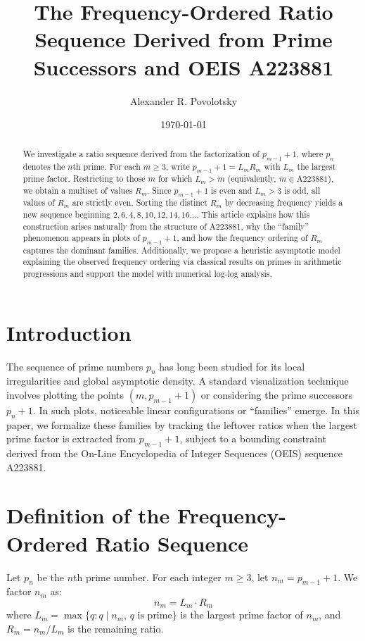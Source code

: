 \documentclass[11pt,fleqn]{article}
\begin{document}
\title{The Frequency-Ordered Ratio Sequence Derived from Prime Successors and OEIS A223881}
\author{Alexander R. Povolotsky}
\date{\today}
\maketitle

\begin{abstract}
We investigate a ratio sequence derived from the factorization of $p_{m-1} + 1$, where $p_n$ denotes the $n$th prime. For each $m \geq 3$, write $p_{m-1} + 1 = L_m R_m$ with $L_m$ the largest prime factor. Restricting to those $m$ for which $L_m > m$ (equivalently, $m \in \text{A223881}$), we obtain a multiset of values $R_m$. Since $p_{m-1}+1$ is even and $L_m > 3$ is odd, all values of $R_m$ are strictly even. Sorting the distinct $R_m$ by decreasing frequency yields a new sequence beginning $2, 6, 4, 8, 10, 12, 14, 16 \dots$. This article explains how this construction arises naturally from the structure of A223881, why the ``family'' phenomenon appears in plots of $p_{m-1} + 1$, and how the frequency ordering of $R_m$ captures the dominant families. Additionally, we propose a heuristic asymptotic model explaining the observed frequency ordering via classical results on primes in arithmetic progressions and support the model with numerical log-log analysis.
\end{abstract}

\section{Introduction}
The sequence of prime numbers $p_n$ has long been studied for its local irregularities and global asymptotic density. A standard visualization technique involves plotting the points $(m, p_{m-1}+1)$ or considering the prime successors $p_{n}+1$. In such plots, noticeable linear configurations or ``families'' emerge. In this paper, we formalize these families by tracking the leftover ratios when the largest prime factor is extracted from $p_{m-1}+1$, subject to a bounding constraint derived from the On-Line Encyclopedia of Integer Sequences (OEIS) sequence A223881.

\section{Definition of the Frequency-Ordered Ratio Sequence}
Let $p_n$ be the $n$th prime number. For each integer $m \geq 3$, let $n_m = p_{m-1} + 1$. We factor $n_m$ as:
\begin{equation}
    n_m = L_m \cdot R_m
\end{equation}
where $L_m = \max \{ q : q \mid n_m, \, q \text{ is prime} \}$ is the largest prime factor of $n_m$, and $R_m = n_m / L_m$ is the remaining ratio.
\end{document}
